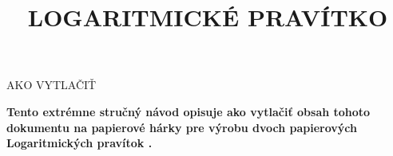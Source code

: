
\newcommand{\makefulltitle}{Ako vytlačiť Logaritmické pravítko }



\title{\fontsize{60}{60}\selectfont LOGARITMICKÉ PRAVÍTKO}
\preauthor{}\postauthor{}\author{}
\predate{}\postdate{}\date{}


  \begin{center}
    \headingfont\fontsize{20}{20}\selectfont AKO VYTLAČIŤ
  \end{center}

  {\let\newpage\relax\maketitle}%
  \nosection{}
  \large\textbf{\makeperex Tento extrémne stručný návod opisuje ako vytlačiť obsah tohoto dokumentu na papierové hárky pre výrobu dvoch papierových Logaritmických pravítok \modelname.}

